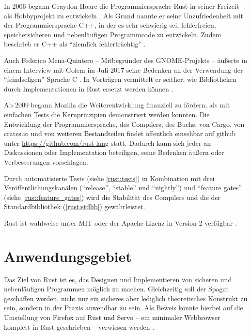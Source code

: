 In 2006 begann Graydon Hoare die Programmiersprache Rust in seiner Freizeit als Hobbyprojekt zu entwickeln \cite{rust:faq}.
Als Grund nannte er seine Unzufriedenheit mit der Programmiersprache C++, in der es sehr schwierig sei, fehlerfreien, speichersicheren und nebenläufigen Programmcode zu entwickeln.
Zudem beschrieb er C++ als \enquote{ziemlich fehlerträchtig} \cite{rust:heise_interview_graydon}.

Auch Federico Mena-Quintero -- Mitbegründer des GNOME-Projekts \cite{rust:gnome:federico}  --
äußerte in einem Interview mit Golem im Juli 2017 seine Bedenken an der Verwendung der \enquote{feindseligen} Sprache C \cite{rust:c_is_hostile_golem}.
In Vorträgen vermittelt er seither, wie Bibliotheken durch Implementationen in Rust ersetzt werden können \cite{rust:c_is_hostile_mena}.

Ab 2009 begann Mozilla die Weiterentwicklung finanziell zu fördern, als mit einfachen Tests die Kernprinzipien demonstriert werden konnten.
Die Entwicklung der Programmiersprache, des Compilers, des Buchs, von Cargo, von crates.io und von weiteren Bestandteilen findet öffentlich einsehbar auf \gls{github}  unter \url{https://github.com/rust-lang} statt.
Dadurch kann sich jeder an Diskussionen oder Implementation beteiligen, seine Bedenken äußern oder Verbesserungen vorschlagen.

Durch automatisierte Tests (siehe \autoref{rust:tests}) in Kombination mit drei Veröffentlichungskanälen (\enquote{release}, \enquote{stable} und \enquote{nightly}) und \enquote{feature gates} (siehe \autoref{rust:feature_gates}) wird die Stabilität des Compilers und die der Standardbibliothek (\autoref{rust:stdlib}) gewährleistet.

Rust ist wahlweise unter MIT oder der Apache Lizenz in Version 2 verfügbar \cite{rust:copyright}.

\section{Anwendungsgebiet}

Das Ziel von Rust ist es, das Designen und Implementieren von sicheren und nebenläufigen Programmen möglich zu machen.
Gleichzeitig soll der Spagat geschaffen werden, nicht nur ein sicheres aber lediglich theoretisches Konstrukt zu sein, sondern  in der Praxis anwendbar zu sein.
Als Beweis könnte hierbei auf die Umstellung von Firefox auf Rust und Servo -- ein minimaler Webbrowser komplett in Rust geschrieben -- verwiesen werden \cite{rust:faq}.

